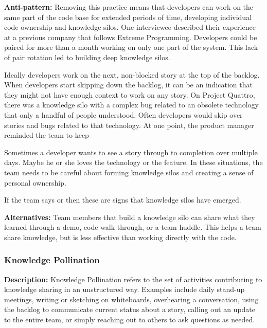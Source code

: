 \begin{table}[]
\textbf{Anti-pattern:} Removing this practice means that developers can work on the same part of the code base for extended periods of time, developing individual code ownership and knowledge silos. One interviewee described their experience at a previous company that follows Extreme Programming. Developers could be paired for more than a month working on only one part of the system. This lack of pair rotation led to building deep knowledge silos. 

Ideally developers work on the next, non-blocked story at the top of the backlog. When developers start skipping down the backlog, it can be an indication that they might not have enough context to work on any story. On Project Quattro, there was a knowledge silo with a complex bug related to an obsolete technology that only a handful of people understood. Often developers would skip over stories and bugs related to that technology. At one point, the product manager reminded the team to keep 

Sometimes a developer wants to see a story through to completion over multiple days. Maybe he or she loves the technology or the feature. In these situations, the team needs to be careful about forming knowledge silos and creating a sense of personal ownership.

If the team says  or  then these are signs that knowledge silos have emerged. 

\textbf{Alternatives:} Team members that build a knowledge silo can share what they learned through a demo, code walk through, or a team huddle. This helps a team share knowledge, but is less effective than working directly with the code. 

\subsubsection{Knowledge Pollination}
\textbf{Description:} Knowledge Pollination refers to the set of activities contributing to knowledge sharing in an unstructured way. Examples include daily stand-up meetings, writing or sketching on whiteboards, overhearing a conversation, using the backlog to communicate current status about a story, calling out an update to the entire team, or simply reaching out to others to ask questions as needed. 


\end{table}
